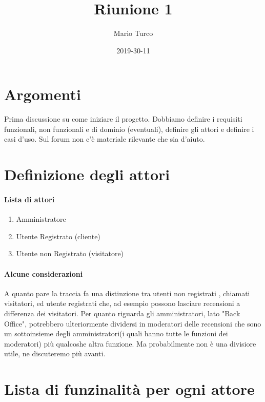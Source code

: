 \documentclass{article}
\title{Riunione 1}
\date{2019-30-11}
\author{Mario Turco}
\begin{document}
\maketitle
{}
\newpage
{}

\section{Argomenti}

Prima discussione su come iniziare il progetto.
Dobbiamo definire i requisiti funzionali, non funzionali e di dominio (eventuali), definire gli attori e definire i casi d'uso.
Sul forum non c'è materiale rilevante che sia d'aiuto.

\section{Definizione degli attori}
  \paragraph{Lista di attori}
  \begin{enumerate}
      \item Amministratore
      \item Utente Registrato (cliente)
      \item Utente non Registrato (visitatore)
  \end{enumerate}
  \paragraph{Alcune considerazioni}
  A quanto pare la traccia fa una distinzione tra utenti non registrati , chiamati visitatori, ed utente registrati
  che, ad esempio possono lasciare recensioni a differenza dei visitatori.
  Per quanto riguarda gli amministratori, lato "Back Office", potrebbero ulteriormente dividersi in moderatori 
  delle recensioni che sono un sottoinsieme degli amministratori(i quali hanno tutte le funzioni dei moderatori)
 più qualcoshe altra funzione. Ma probabilmente non è una divisiore utile, ne discuteremo più avanti.

 \section{Lista di funzinalità per ogni attore}
\end{document}
